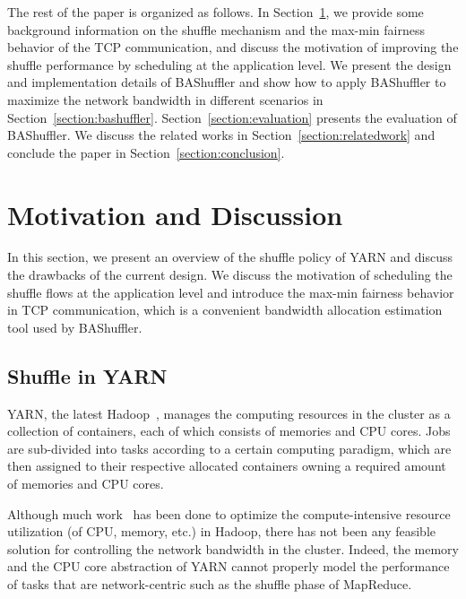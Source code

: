 \documentclass[10pt,journal,compsoc]{IEEEtran}
\begin{document}
The rest of the paper is organized as follows.
In Section~\ref{section:background}, we provide some background information on the shuffle mechanism
and the max-min fairness behavior of the TCP communication, and discuss the motivation of improving the shuffle performance by scheduling at the application level.
We present the design and implementation details of BAShuffler and show how to apply BAShuffler to maximize the network bandwidth in different scenarios in Section~\ref{section:bashuffler}.
Section~\ref{section:evaluation} presents the evaluation of BAShuffler.
We discuss the related works in Section~\ref{section:relatedwork} and
conclude the paper in Section~\ref{section:conclusion}. 



\section{Motivation and Discussion}\label{section:background}
In this section, we present an overview of the shuffle policy of YARN and discuss the drawbacks of the current design. 
We discuss the motivation of scheduling the shuffle flows at the application level
and introduce the max-min fairness behavior in TCP communication, which is
a convenient bandwidth allocation estimation tool used by BAShuffler. 

\subsection{Shuffle in YARN}

YARN, the latest Hadoop~\cite{white2015hadoop}, manages the computing resources in the cluster as a collection
of containers, each of which consists of memories and CPU cores. 
Jobs are sub-divided into tasks according to a certain
computing paradigm, which are then assigned to their respective allocated
containers
owning a required amount of memories and CPU cores.

 
Although much work~\cite{Delimitrou:2014:QRQ, smapreduce} has been done to optimize the compute-intensive
resource utilization (of CPU, memory, etc.) in
Hadoop, there has not been any
feasible solution for controlling the network bandwidth in the
cluster.
Indeed,
the memory and the CPU core abstraction of YARN cannot properly model the
performance of tasks that are network-centric such as
the shuffle phase of MapReduce. 
 
\end{document}
